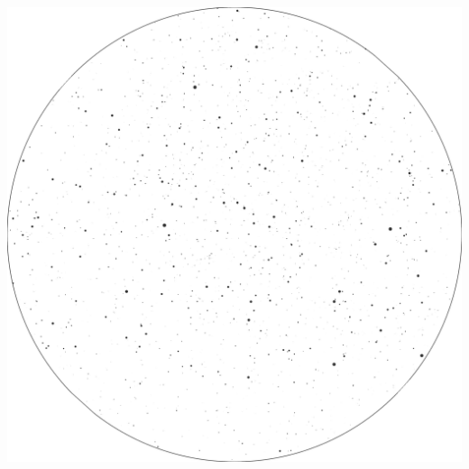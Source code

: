 \documentclass{./SAS-class-skygen}
\begin{document}
	\vspace{0.5cm}
    \begin{center}
    \includegraphics[width=\textwidth]{./pics/skychart33.png}
    \end{center}
    
    
\end{document}
